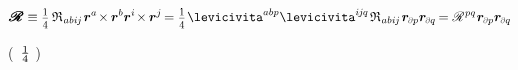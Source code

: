 \begin{otherlanguage}{russian}
\begin{equation*}
\hspace{.1ex}\pmb{\scalebox{1.2}[1]{$\mathscr{R}$}} \equiv
\smalldisplaystyleonefourth \hspace{.4ex} \mathfrak{R}_{\hspace{.1ex}abi\hspace{-0.1ex}j} \hspace{.2ex} \locationvector^a \hspace{-0.33ex} \times \hspace{-0.1ex} \locationvector^b \locationvector^i \hspace{-0.33ex} \times \hspace{-0.1ex} \locationvector^j \hspace{-0.25ex}
= \smalldisplaystyleonefourth \hspace{.15ex} \levicivita^{abp} \levicivita^{i\hspace{-0.1ex}j\hspace{-0.1ex}q} \hspace{.25ex} \mathfrak{R}_{\hspace{.1ex}abi\hspace{-0.1ex}j} \hspace{.2ex} \locationvector_\differentialindex{p} \locationvector_\differentialindex{q} \hspace{-0.2ex}
= \mathscr{R}^{\hspace{.1ex}pq} \hspace{.1ex} \locationvector_\differentialindex{p} \locationvector_\differentialindex{q}
\end{equation*}

\vspace{-0.2em} \noindent
(~$\onefourth$ ) 


\end{otherlanguage}
